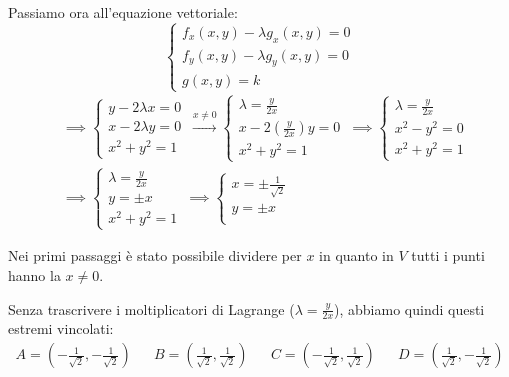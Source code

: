 Passiamo ora all'equazione vettoriale:
\medskip
\begin{equation*}
    \begin{cases}
        f_x(x,y) - \lambda g_x(x,y) = 0 \\
        f_y(x,y) - \lambda g_y(x,y) = 0 \\
        g(x,y) = k
    \end{cases}
\end{equation*}
\smallskip
\begin{equation*}
    \begin{split}
         & \implies
        \begin{cases}
            y -2 \lambda x= 0  \\
            x -2 \lambda y = 0 \\
            x^{2}+ y^{2}= 1
        \end{cases}
        \,\xrightarrow[]{x \ne 0}
        \begin{cases}
            \lambda= \frac{y}{2x}  \\
            x-2( \frac{y}{2x})y= 0 \\
            x^{2}+ y^{2}= 1
        \end{cases}
        \,\implies
        \begin{cases}
            \lambda= \frac{y}{2x} \\
            x^{2}-y^{2}= 0        \\
            x^{2}+ y^{2}= 1
        \end{cases} \\
         & \implies
        \begin{cases}
            \lambda= \frac{y}{2x} \\
            y= \pm x              \\
            x^{2}+ y^{2}= 1
        \end{cases}
        \,\implies
        \begin{cases}
            x = \pm \frac{1}{\sqrt{2}} \\
            y= \pm x                   \\
        \end{cases}
    \end{split}
\end{equation*}

Nei primi passaggi è stato possibile dividere per \(x\) in quanto in \(V\) tutti i punti hanno la \(x \ne 0\).

Senza trascrivere i moltiplicatori di Lagrange (\(\lambda= \frac{y}{2x}\)), abbiamo quindi questi estremi vincolati:
\medskip
\begin{align*}
    A=\left( -\frac{1}{\sqrt{2}}, -\frac{1}{\sqrt{2}} \right)
     &  &
    B=\left(  \frac{1}{\sqrt{2}},  \frac{1}{\sqrt{2}} \right)
     &  &
    C=\left( -\frac{1}{\sqrt{2}},  \frac{1}{\sqrt{2}} \right)
     &  &
    D=\left(  \frac{1}{\sqrt{2}}, -\frac{1}{\sqrt{2}} \right)
\end{align*}

